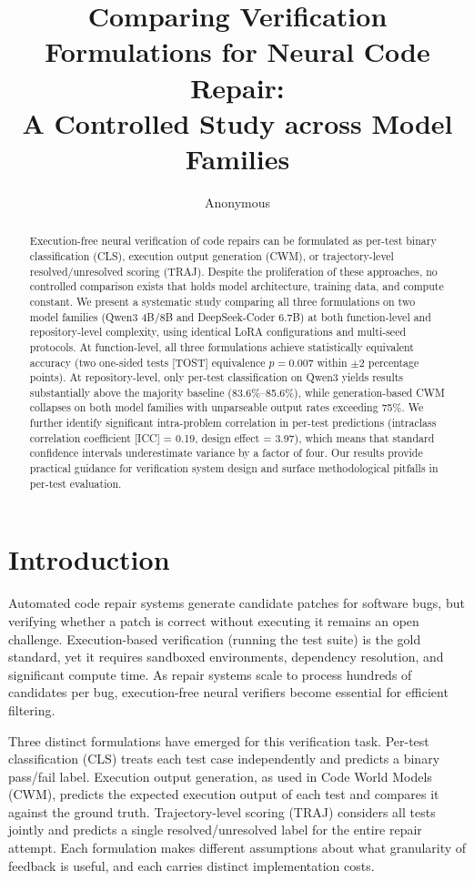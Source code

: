\documentclass[11pt,a4paper]{article}
\title{Comparing Verification Formulations for Neural Code Repair:\\A Controlled Study across Model Families}
\author{Anonymous}
\date{}
\begin{document}
\maketitle

\begin{abstract}
Execution-free neural verification of code repairs can be formulated as per-test binary classification (CLS), execution output generation (CWM), or trajectory-level resolved/unresolved scoring (TRAJ). Despite the proliferation of these approaches, no controlled comparison exists that holds model architecture, training data, and compute constant. We present a systematic study comparing all three formulations on two model families (Qwen3 4B/8B and DeepSeek-Coder 6.7B) at both function-level and repository-level complexity, using identical LoRA configurations and multi-seed protocols. At function-level, all three formulations achieve statistically equivalent accuracy (two one-sided tests [TOST] equivalence $p{=}0.007$ within $\pm$2 percentage points). At repository-level, only per-test classification on Qwen3 yields results substantially above the majority baseline (83.6\%--85.6\%), while generation-based CWM collapses on both model families with unparseable output rates exceeding 75\%. We further identify significant intra-problem correlation in per-test predictions (intraclass correlation coefficient [ICC] = 0.19, design effect = 3.97), which means that standard confidence intervals underestimate variance by a factor of four. Our results provide practical guidance for verification system design and surface methodological pitfalls in per-test evaluation.
\end{abstract}

\section{Introduction}

Automated code repair systems generate candidate patches for software bugs, but verifying whether a patch is correct without executing it remains an open challenge. Execution-based verification (running the test suite) is the gold standard, yet it requires sandboxed environments, dependency resolution, and significant compute time. As repair systems scale to process hundreds of candidates per bug, execution-free neural verifiers become essential for efficient filtering.

Three distinct formulations have emerged for this verification task. Per-test classification (CLS) treats each test case independently and predicts a binary pass/fail label. Execution output generation, as used in Code World Models (CWM), predicts the expected execution output of each test and compares it against the ground truth. Trajectory-level scoring (TRAJ) considers all tests jointly and predicts a single resolved/unresolved label for the entire repair attempt. Each formulation makes different assumptions about what granularity of feedback is useful, and each carries distinct implementation costs.
\end{document}
